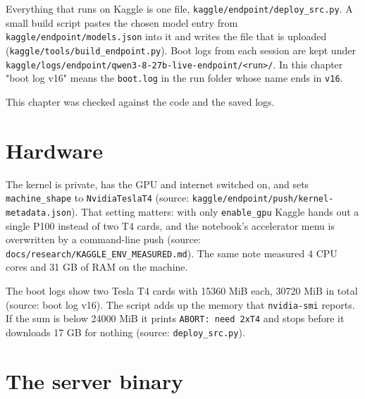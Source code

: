 \documentclass[11pt,a4paper]{report}
\begin{document}
Everything that runs on Kaggle is one file, \texttt{kaggle/\allowbreak{}endpoint/\allowbreak{}deploy\_\allowbreak{}src.\allowbreak{}py}. A small build script pastes the chosen model entry from \texttt{kaggle/\allowbreak{}endpoint/\allowbreak{}models.\allowbreak{}json} into it and writes the file that is uploaded (\texttt{kaggle/\allowbreak{}tools/\allowbreak{}build\_\allowbreak{}endpoint.\allowbreak{}py}). Boot logs from each session are kept under \texttt{kaggle/\allowbreak{}logs/\allowbreak{}endpoint/\allowbreak{}qwen3-\allowbreak{}8-\allowbreak{}27b-\allowbreak{}live-\allowbreak{}endpoint/\allowbreak{}\textless{}run\textgreater{}/\allowbreak{}}. In this chapter "boot log v16" means the \texttt{boot.\allowbreak{}log} in the run folder whose name ends in \texttt{v16}.

This chapter was checked against the code and the saved logs.

\section{Hardware}

The kernel is private, has the GPU and internet switched on, and sets \texttt{machine\_\allowbreak{}shape} to \texttt{NvidiaTeslaT4} (source: \texttt{kaggle/\allowbreak{}endpoint/\allowbreak{}push/\allowbreak{}kernel-\allowbreak{}metadata.\allowbreak{}json}). That setting matters: with only \texttt{enable\_\allowbreak{}gpu} Kaggle hands out a single P100 instead of two T4 cards, and the notebook's accelerator menu is overwritten by a command-line push (source: \texttt{docs/\allowbreak{}research/\allowbreak{}KAGGLE\_\allowbreak{}ENV\_\allowbreak{}MEASURED.\allowbreak{}md}). The same note measured 4 CPU cores and 31 GB of RAM on the machine.

The boot logs show two Tesla T4 cards with 15360 MiB each, 30720 MiB in total (source: boot log v16). The script adds up the memory that \texttt{nvidia-\allowbreak{}smi} reports. If the sum is below 24000 MiB it prints \texttt{ABORT: need 2xT4} and stops before it downloads 17 GB for nothing (source: \texttt{deploy\_\allowbreak{}src.\allowbreak{}py}).

\section{The server binary}
\end{document}
